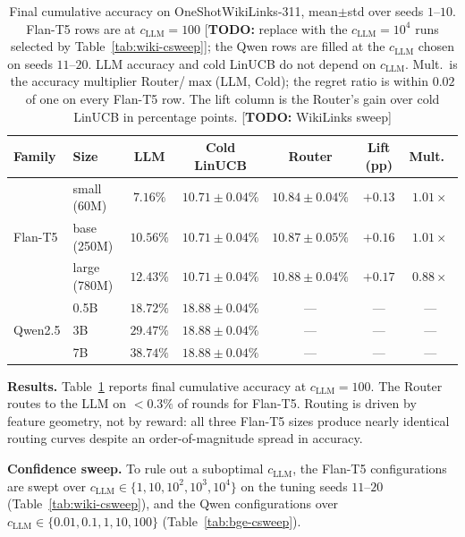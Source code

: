 \documentclass{article}
\theoremstyle{definition}
\theoremstyle{remark}
\theoremstyle{remark}
\newcommand{\todo}[1]{\textcolor{red!70!black}{[\textbf{TODO:} #1]}}
\begin{document}
\begin{table}[h]
\centering
\caption{Final cumulative accuracy on OneShotWikiLinks-311, mean$\pm$std over
seeds $1$--$10$. Flan-T5 rows are at $c_{\mathrm{LLM}}=100$ \todo{replace with the
$c_{\mathrm{LLM}}=10^4$ runs selected by Table~\ref{tab:wiki-csweep}}; the Qwen rows are filled at the
$c_{\mathrm{LLM}}$ chosen on seeds $11$--$20$. LLM accuracy and cold LinUCB do not depend on
$c_{\mathrm{LLM}}$. Mult.\ is the accuracy multiplier Router/$\max$(LLM, Cold); the regret
ratio is within $0.02$ of one on every Flan-T5 row. The lift column is the
Router's gain over cold LinUCB in percentage points. \todo{WikiLinks sweep}}
\label{tab:wiki-results}
\small
\begin{tabular}{@{}llccccc@{}}
\toprule
Family & Size & LLM & Cold LinUCB & Router & Lift (pp) & Mult.\ \\
\midrule
\multirow{3}{*}{Flan-T5} & small (60M) & $7.16\%$  & $10.71\pm 0.04\%$ & $10.84\pm 0.04\%$ & $+0.13$ & $1.01\times$ \\
& base (250M)   & $10.56\%$ & $10.71\pm 0.04\%$ & $10.87\pm 0.05\%$ & $+0.16$ & $1.01\times$ \\
& large (780M)  & $12.43\%$ & $10.71\pm 0.04\%$ & $10.88\pm 0.04\%$ & $+0.17$ & $0.88\times$ \\
\midrule
\multirow{3}{*}{Qwen2.5} & 0.5B  & $18.72\%$ & $18.88\pm 0.04\%$ & --- & --- & --- \\
& 3B  & $29.47\%$ & $18.88\pm 0.04\%$ & --- & --- & --- \\
& 7B  & $38.74\%$ & $18.88\pm 0.04\%$ & --- & --- & --- \\
\bottomrule
\end{tabular}
\end{table}

\textbf{Results.} Table~\ref{tab:wiki-results} reports final cumulative
accuracy at $c_{\mathrm{LLM}}=100$. The Router routes to the LLM on $<0.3\%$ of rounds for
Flan-T5. Routing is driven by feature geometry, not by
reward: all three Flan-T5 sizes produce nearly identical routing curves
despite an order-of-magnitude spread in accuracy.

\textbf{Confidence sweep.} To rule out a suboptimal $c_{\mathrm{LLM}}$, the Flan-T5
configurations are swept over $c_{\mathrm{LLM}}\in\{1,10,10^2,10^3,10^4\}$ on the tuning seeds
$11$--$20$ (Table~\ref{tab:wiki-csweep}), and the Qwen configurations over
$c_{\mathrm{LLM}}\in\{0.01,0.1,1,10,100\}$ (Table~\ref{tab:bge-csweep}).
\end{document}
